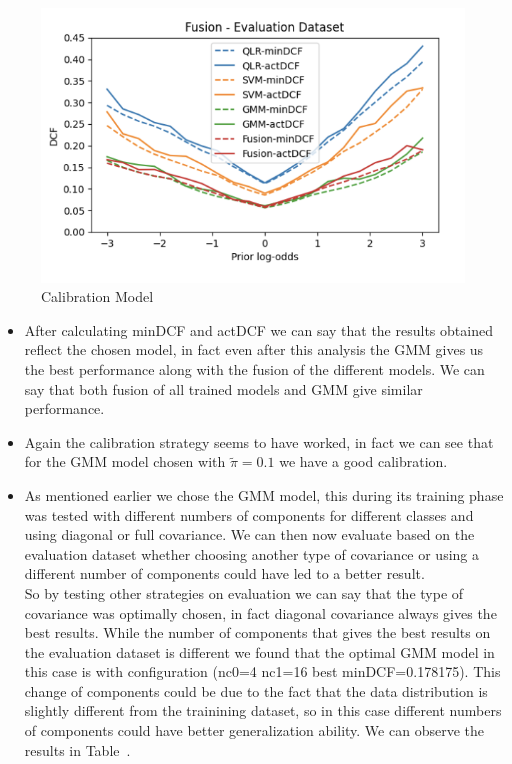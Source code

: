 \documentclass{article}
\begin{document}
\begin{figure}[H]
\begin{minipage}{.4\textwidth}
    \end{minipage}
    \begin{minipage}{.4\textwidth}
        \centering
        \includegraphics[width=\linewidth]{./img/EVAL4.png}
    \end{minipage}
    \caption{Calibration Model} %
    \label{fig:CalEVAL} %
\end{figure}
\begin{itemize}
    \item After calculating minDCF and actDCF we can say that the results obtained reflect the chosen model, in fact even after this analysis the GMM gives us the best performance along with the fusion of the different models. We can say that both fusion of all trained models and GMM give similar performance.
    \item Again the calibration strategy seems to have worked, in fact we can see that for the GMM model chosen with \(\tilde{\pi}=0.1\) we have a good calibration.
    \item As mentioned earlier we chose the GMM model, this during its training phase was tested with different numbers of components for different classes and using diagonal or full covariance. We can then now evaluate based on the evaluation dataset whether choosing another type of covariance or using a different number of components could have led to a better result. \\
    So by testing other strategies on evaluation we can say that the type of covariance was optimally chosen, in fact diagonal covariance always gives the best results. While the number of components that gives the best results on the evaluation dataset is different we found that the optimal GMM model in this case is with configuration (nc0=4 nc1=16 best minDCF=0.178175). This change of components could be due to the fact that the data distribution is slightly different from the trainining dataset, so in this case different numbers of components could have better generalization ability.
    We can observe the results in Table~.
\end{itemize}
\end{document}
